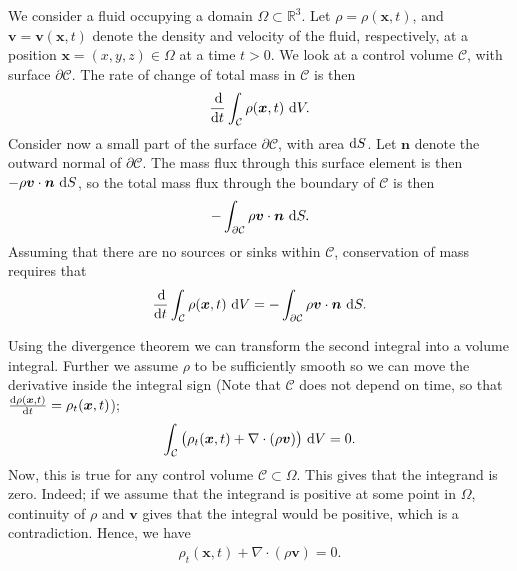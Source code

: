 \documentclass[11pt]{article}
\begin{document}
We consider a fluid occupying a domain $\Omega \subset \mathbb{R}^3$. Let $\rho = \rho(\bm{x}, t)$, and
$\bm{v} = \bm{v}(\bm{x},t)$ denote the density and velocity of the fluid, respectively, at a position
$\bm{x} = (x,y,z) \in \Omega$ at a time $t > 0$. We look at a control volume $\mathcal{C}$, with surface $\partial \mathcal{C}$.
The rate of change of total mass in $\mathcal{C}$ is then
\begin{align*}
    \frac{\operatorname{d}\!}{\operatorname{d}\! t}\int_\mathcal{C} \rho(\bm{x},t) \, \operatorname{d}\! V.
\end{align*}
Consider now a small part of the surface $\partial \mathcal{C}$, with area $\operatorname{d}\! S$. Let $\bm{n}$ denote the outward normal
of $\partial \mathcal{C}$. The mass flux through this surface element is then $-\rho \bm{v} \cdot \bm{n} \, \operatorname{d}\! S$, so the
total mass flux through the boundary of $\mathcal{C}$ is then
\begin{align*}
    -\int_{\partial \mathcal{C}}\rho \bm{v} \cdot \bm{n} \, \operatorname{d}\! S.
\end{align*}
Assuming that there are no sources or sinks within $\mathcal{C}$, conservation of mass requires that
\begin{align*}
    \frac{\operatorname{d}\!}{\operatorname{d}\! t}\int_\mathcal{C} \rho(\bm{x},t) \, \operatorname{d}\! V
                            = -\int_{\partial \mathcal{C}}\rho \bm{v} \cdot \bm{n} \, \operatorname{d}\! S.
\end{align*}

Using the divergence theorem we can transform the second integral into
a volume integral. Further we assume $\rho$ to be sufficiently smooth
so we can move the derivative inside the integral sign (Note that
$\mathcal{C}$ does not depend on time, so that $\frac{\operatorname{d}\! \rho(\bm x,t)}{\operatorname{d}\!
  t}= \rho_t(\bm x, t)$);
\begin{align*}
    \int_\mathcal{C} \big(\rho_t(\bm{x},t) + \nabla \cdot (\rho \bm{v}) \big) \, \operatorname{d}\! V = 0.
\end{align*}
Now, this is true for any control volume $\mathcal{C} \subset \Omega$. This gives that the integrand is zero. Indeed;
if we assume that the integrand is positive at some point in $\Omega$, continuity of $\rho$ and $\bm{v}$
gives that the integral would be positive, which is a contradiction. Hence, we have
\begin{align}
    \label{eq:massConservation}
    \rho_t(\bm{x},t) + \nabla \cdot (\rho \bm{v}) = 0.
\end{align}
%
%
\end{document}

